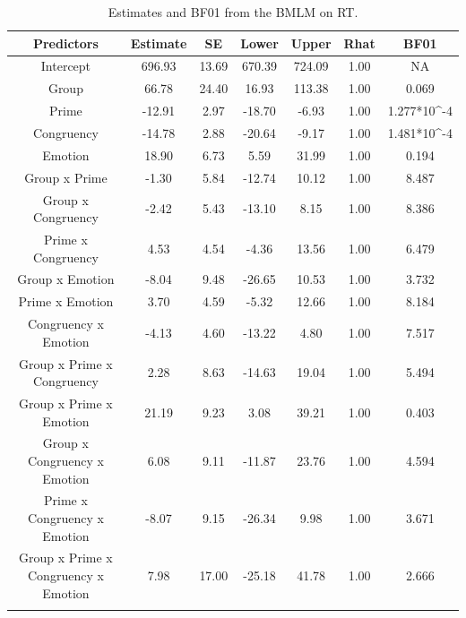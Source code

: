 \documentclass[
  11pt,
  english,
  ,doc,floatsintext]{apa6}
\begin{document}
\begin{table}[htb]

\begin{center}
\begin{threeparttable}

\caption{\label{tab:summaryBMgcpe}Estimates and BF01 from the BMLM on RT.}

\small{

\begin{tabular}{ccccccc}
\toprule
Predictors & \multicolumn{1}{c}{Estimate} & \multicolumn{1}{c}{SE} & \multicolumn{1}{c}{Lower} & \multicolumn{1}{c}{Upper} & \multicolumn{1}{c}{Rhat} & \multicolumn{1}{c}{BF01}\\
\midrule
Intercept & 696.93 & 13.69 & 670.39 & 724.09 & 1.00 & NA\\
Group & 66.78 & 24.40 & 16.93 & 113.38 & 1.00 & 0.069\\
Prime & -12.91 & 2.97 & -18.70 & -6.93 & 1.00 & 1.277*10\textasciicircum{}-4\\
Congruency & -14.78 & 2.88 & -20.64 & -9.17 & 1.00 & 1.481*10\textasciicircum{}-4\\
Emotion & 18.90 & 6.73 & 5.59 & 31.99 & 1.00 & 0.194\\
Group x Prime & -1.30 & 5.84 & -12.74 & 10.12 & 1.00 & 8.487\\
Group x Congruency & -2.42 & 5.43 & -13.10 & 8.15 & 1.00 & 8.386\\
Prime x Congruency & 4.53 & 4.54 & -4.36 & 13.56 & 1.00 & 6.479\\
Group x Emotion & -8.04 & 9.48 & -26.65 & 10.53 & 1.00 & 3.732\\
Prime x Emotion & 3.70 & 4.59 & -5.32 & 12.66 & 1.00 & 8.184\\
Congruency x Emotion & -4.13 & 4.60 & -13.22 & 4.80 & 1.00 & 7.517\\
Group x Prime x Congruency & 2.28 & 8.63 & -14.63 & 19.04 & 1.00 & 5.494\\
Group x Prime x Emotion & 21.19 & 9.23 & 3.08 & 39.21 & 1.00 & 0.403\\
Group x Congruency x Emotion & 6.08 & 9.11 & -11.87 & 23.76 & 1.00 & 4.594\\
Prime x Congruency x Emotion & -8.07 & 9.15 & -26.34 & 9.98 & 1.00 & 3.671\\
Group x Prime x Congruency x Emotion & 7.98 & 17.00 & -25.18 & 41.78 & 1.00 & 2.666\\
\bottomrule
\addlinespace
\end{tabular}

}


\end{threeparttable}
\end{center}
\end{table}
\end{document}

